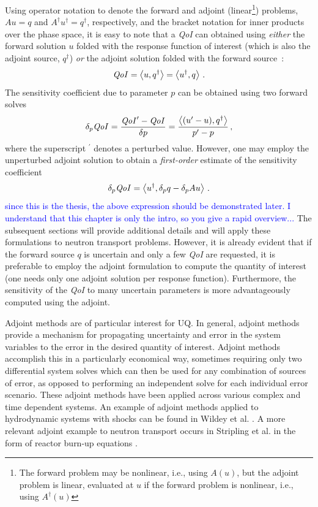 \documentclass[12pt]{report}
\newcommand{\bra}{\left\langle}
\newcommand{\ket}{\right\rangle}
\newcommand{\qoi}{{\it QoI}\xspace}
\newcommand{\comment}[2]{\marginpar{\textcolor{#2}{$\star$}}\textcolor{#2}{#1}\newline}
\newcommand{\jcr}[1]{\comment{#1}{blue}}
\newcommand{\jcr}[1]{\phantom{a}}
\begin{document}
Using operator notation to denote the forward and adjoint (linear\footnote{The forward problem may be nonlinear, i.e., using $A(u)$, but the adjoint problem is linear, evaluated at $u$ if the forward problem is nonlinear, i.e., using $A^\dag(u)$}) problems, $Au=q$ and $A^\dag u^\dag = q^\dag$, respectively, and the bracket notation for inner products over the phase space, it is easy to note that a \qoi can 
obtained using {\it either} the forward solution $u$ folded with the response function of interest (which is also the adjoint source, $q^\dag$) {\it or} the adjoint solution folded with the forward source~:
\[
\qoi = \bra u, q^\dag \ket = \bra u^\dag, q \ket \,.
\]
The sensitivity coefficient due to parameter $p$ can be obtained using two forward solves
\[
\delta_p \qoi = \frac{\qoi^\prime - \qoi}{\delta p} = \frac{ \bra (u^\prime - u), q^\dag \ket}{p^\prime - p}  \,,
\]
where the superscript $^\prime$ denotes a perturbed value. However, one may employ the unperturbed adjoint solution to obtain
a {\it first-order} estimate of the sensitivity coefficient
\[
\delta_p \qoi = \bra u^\dag, \delta_p q - \delta_p A u \ket \,.
\]
\jcr{since this is the thesis, the above expression should be demonstrated later. I understand that this chapter is only the intro, so you give a rapid overview...}
The subsequent sections will provide additional details and will apply these formulations to neutron transport problems. However, it is already evident that if the forward source $q$ is uncertain and only a few \qoi are requested, it is preferable to employ the adjoint formulation to compute the quantity of interest (one needs only one adjoint solution per response function). Furthermore, the sensitivity of the
\qoi to many uncertain parameters is more advantageously computed using the adjoint.


Adjoint methods are of particular interest for UQ. In general, adjoint methods provide a mechanism for propagating uncertainty and error in the system variables to the error in the desired quantity of interest. Adjoint methods accomplish this in a particularly economical way, sometimes requiring only two differential system solves which can then be used for any combination of sources of error, as opposed to performing an independent solve for each individual error scenario. These adjoint methods have been applied across various complex and time dependent systems. An example of adjoint methods applied to hydrodynamic systems with shocks can be found in Wildey et al. \cite{Wildey}. A more relevant adjoint example to neutron transport occurs in Stripling et al. in the form of reactor burn-up equations \cite{Stripling}.
\end{document}
